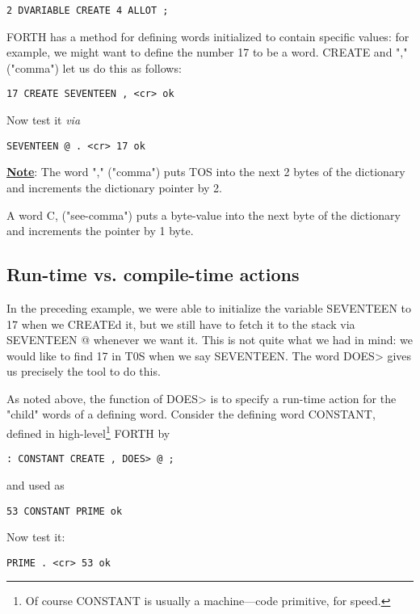 \begin{lstlisting}
2 DVARIABLE CREATE 4 ALLOT ;
\end{lstlisting}

FORTH has a method for defining words initialized to contain specific values: for example, we might want to define the number 17 to be a word. CREATE and "," ("comma") let us do this as follows:

\begin{lstlisting}
17 CREATE SEVENTEEN , <cr> ok
\end{lstlisting}

Now test it \textit{via}

\begin{lstlisting}
SEVENTEEN @ . <cr> 17 ok
\end{lstlisting}

\underline{\textbf{Note}}: The word "," ("comma") puts TOS into the next 2 bytes of the dictionary and increments the dictionary pointer by 2.

A word C, ("see-comma") puts a byte-value into the next byte of the dictionary and increments the pointer by 1 byte.

\subsection{Run-time vs. compile-time actions}

In the preceding example, we were able to initialize the variable SEVENTEEN to 17 when we CREATEd it, but we still have to fetch it to the stack via SEVENTEEN @ whenever we want it. This is not quite what we had in mind: we would like to find 17 in T0S when we say SEVENTEEN. The word DOES> gives us precisely the tool to do this.

As noted above, the function of DOES> is to specify a run-time action for the "child" words of a defining word. Consider the defining word CONSTANT, defined in high-level\footnote{Of course CONSTANT is usually a machine—code primitive, for speed.} FORTH by

\begin{lstlisting}
: CONSTANT CREATE , DOES> @ ;
\end{lstlisting}
and used as
\begin{lstlisting}
53 CONSTANT PRIME ok
\end{lstlisting}

Now test it:
\begin{lstlisting}
PRIME . <cr> 53 ok
\end{lstlisting}

